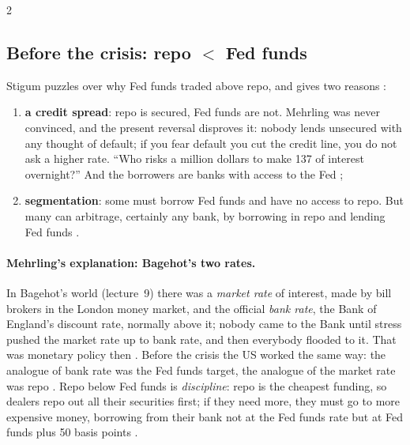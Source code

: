 \begin{paracol}{2}
\subsection{Before the crisis: repo $<$ Fed funds}
Stigum puzzles over why Fed funds traded above repo, and gives two reasons :
\begin{enumerate}
  \item \textbf{a credit spread}: repo is secured, Fed funds are not. Mehrling was never convinced, and the present reversal disproves it: nobody lends unsecured
        with any thought of default; if you fear default you cut the credit line, you do not ask a higher rate. ``Who risks a million dollars to make 137 of
        interest overnight?'' And the borrowers are banks with access to the Fed ;
  \item \textbf{segmentation}: some must borrow Fed funds and have no access to repo. But many can arbitrage, certainly any bank, by borrowing in repo and lending
        Fed funds .
\end{enumerate}

\paragraph{Mehrling's explanation: Bagehot's two rates.} In Bagehot's world (lecture~9) there was a \emph{market rate} of interest, made by bill brokers in the
London money market, and the official \emph{bank rate}, the Bank of England's discount rate, normally above it; nobody came to the Bank until stress pushed the market
rate up to bank rate, and then everybody flooded to it. That was monetary policy then . Before the crisis the US
worked the same way: the analogue of bank rate was the Fed funds target, the analogue of the market rate was repo . Repo below Fed funds is
\emph{discipline}: repo is the cheapest funding, so dealers repo out all their securities first; if they need more, they must go to more expensive money, borrowing
from their bank not at the Fed funds rate but at Fed funds plus 50 basis points .


\end{paracol}
